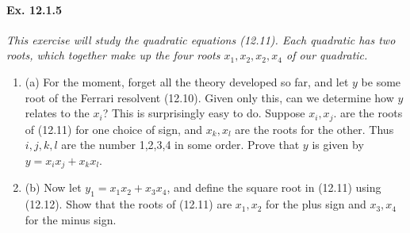 \documentclass[11pt,a4paper]{article}
\newcommand{\be} {\begin{enumerate}}
\newcommand{\ee} {\end{enumerate}}
\begin{document}
\paragraph{Ex. 12.1.5}

{\it This exercise will study the quadratic equations (12.11). Each quadratic has two roots, which together make up the four roots $x_1,x_2,x_2,x_4$ of our quadratic.
\be
\item[(a)] For the moment, forget all the theory developed so far, and let $y$ be some root of the Ferrari resolvent (12.10). Given only this, can we determine how $y$ relates to the $x_i$? This is surprisingly easy to do. Suppose $x_i,x_j$. are the roots of (12.11) for one choice of sign, and $x_k,x_l$ are the roots for the other. Thus $i,j,k,l$ are the number 1,2,3,4 in some order. Prove that $y$ is given by $y=x_ix_j + x_kx_l$.

\item[(b)] Now let $y_1 = x_1x_2 +x_3x_4$, and define the square root in (12.11) using (12.12). Show that the roots of (12.11) are $x_1,x_2$ for the plus sign and $x_3,x_4$ for the minus sign.
\ee
}
\end{document}
